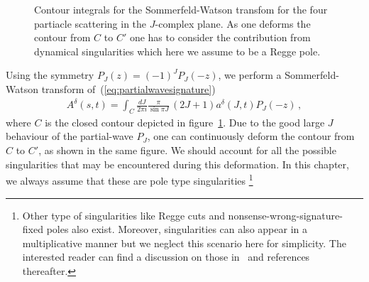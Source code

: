 \begin{figure}[t]
  \centering
  \caption{Contour integrals for the Sommerfeld-Watson transfom for the four partiacle scattering in the $J$-complex plane. As one deforms the contour from $C$ to $C'$ one has to consider the contribution from dynamical singularities which here we assume to be a Regge pole.
  }
  \label{fig:Jplane4pt}
\end{figure}
Using the symmetry $P_J(z)=(-1)^{J}P_J(-z)$, we perform a Sommerfeld-Watson transform of~(\ref{eq:partialwavesignature})
\begin{align}
  A^{\delta}(s,t)=\int_{C} \frac{dJ}{2\pi i} \frac{\pi}{\sin\pi J} \, (2J+1)a^{\delta}(J,t)P_{J}(-z) \,,
\end{align}
where $C$ is the closed contour depicted in figure~\ref{fig:Jplane4pt}. Due to the good large $J$ behaviour of the partial-wave $P_{J}$, one can continuously deform the contour from $C$ to $C'$, as
shown in the same figure.
We should account for all the possible singularities that   may be encountered during this deformation.
In this chapter, we always assume that these are pole type singularities \footnote{Other type of singularities like Regge cuts and nonsense-wrong-signature-fixed poles also exist. Moreover, singularities can also appear in a multiplicative manner but we neglect this scenario here for simplicity. The interested reader can find a discussion on those in~\cite{Weis:1972tbu} and references thereafter.}
